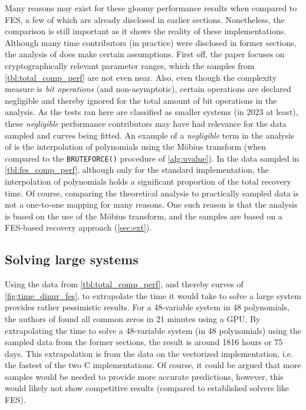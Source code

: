 Many reasons may exist for these gloomy performance results when compared to FES, a few of which are already disclosed in earlier sections. Nonetheless, the comparison is still important as it shows the reality of these implementations. Although many time contributors (in practice) were disclosed in former sections, the analysis of \cite{eurocrypt-2021-30841} does make certain assumptions. First off, the paper focuses on cryptographically relevant parameter ranges, which the samples from \cref{tbl:total_comp_perf} are not even near. Also, even though the complexity measure is \textit{bit operations} (and non-asymptotic), certain operations are declared negligible and thereby ignored for the total amount of bit operations in the analysis. As the tests ran here are classified as smaller systems (in 2023 at least), these \textit{negligible} performance contributors may have had relevance for the data sampled and curves being fitted. An example of a \textit{negligible} term in the analysis of \cite{eurocrypt-2021-30841} is the interpolation of polynomials using the Möbius transform (when compared to the \texttt{BRUTEFORCE()} procedure of \cref{alg:uvalue}). In the data sampled in \cref{tbl:fes_comp_perf}, although only for the standard implementation, the interpolation of polynomials holds a significant proportion of the total recovery time. Of course, comparing the theoretical analysis to practically sampled data is not a one-to-one mapping for many reasons. One such reason is that the analysis is based on the use of the Möbius transform, and the samples are based on a FES-based recovery approach (\cref{sec:ext}).

\subsection{Solving large systems} \label{sec:eval:large}
Using the data from \cref{tbl:total_comp_perf}, and thereby curves of \cref{fig:time_dinur_fes}, to extrapolate the time it would take to solve a large system provides rather pessimistic results. For a 48-variable system in 48 polynomials, the authors of \cite{ches-2010-23990} found all common zeros in 21 minutes using a GPU. By extrapolating the time to solve a 48-variable system (in 48 polynomials) using the sampled data from the former sections, the result is around 1816 hours or 75 days. This extrapolation is from the data on the vectorized implementation, i.e. the fastest of the two C implementations. Of course, it could be argued that more samples would be needed to provide more accurate predictions, however, this would likely not show competitive results (compared to established solvers like FES). 

